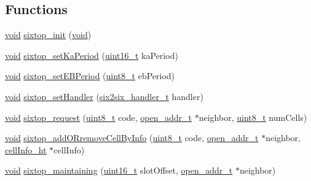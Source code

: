\subsection*{Functions}
\begin{DoxyCompactItemize}
\item 
\hyperlink{usb__devapi_8h_afabf60e7f57651d6d595a02c75f07cd0}{void} \hyperlink{group__sixtop_ga7ebc63dd17f632acdb878a79c1d79da8}{sixtop\+\_\+init} (\hyperlink{usb__devapi_8h_afabf60e7f57651d6d595a02c75f07cd0}{void})
\item 
\hyperlink{usb__devapi_8h_afabf60e7f57651d6d595a02c75f07cd0}{void} \hyperlink{group__sixtop_ga462512c8c301081df10b0d51f7e7bc8b}{sixtop\+\_\+set\+Ka\+Period} (\hyperlink{_p_e___types_8h_a1f1825b69244eb3ad2c7165ddc99c956}{uint16\+\_\+t} ka\+Period)
\item 
\hyperlink{usb__devapi_8h_afabf60e7f57651d6d595a02c75f07cd0}{void} \hyperlink{group__sixtop_ga075d83ee0b50fe58ddb21fe5461b8d37}{sixtop\+\_\+set\+E\+B\+Period} (\hyperlink{_p_e___types_8h_aba7bc1797add20fe3efdf37ced1182c5}{uint8\+\_\+t} eb\+Period)
\item 
\hyperlink{usb__devapi_8h_afabf60e7f57651d6d595a02c75f07cd0}{void} \hyperlink{group__sixtop_ga88c7b3727422755c34000ca4600abfa2}{sixtop\+\_\+set\+Handler} (\hyperlink{group__sixtop_gaa3d42866c0888ad4ae5166773563addd}{six2six\+\_\+handler\+\_\+t} handler)
\item 
\hyperlink{usb__devapi_8h_afabf60e7f57651d6d595a02c75f07cd0}{void} \hyperlink{group__sixtop_ga2839458024d85a3e05fb67767fe7adb9}{sixtop\+\_\+request} (\hyperlink{_p_e___types_8h_aba7bc1797add20fe3efdf37ced1182c5}{uint8\+\_\+t} code, \hyperlink{structopen__addr__t}{open\+\_\+addr\+\_\+t} $\ast$neighbor, \hyperlink{_p_e___types_8h_aba7bc1797add20fe3efdf37ced1182c5}{uint8\+\_\+t} num\+Cells)
\item 
\hyperlink{usb__devapi_8h_afabf60e7f57651d6d595a02c75f07cd0}{void} \hyperlink{group__sixtop_ga83ffb7e25a1e635539b526b15f857dbd}{sixtop\+\_\+add\+O\+Rremove\+Cell\+By\+Info} (\hyperlink{_p_e___types_8h_aba7bc1797add20fe3efdf37ced1182c5}{uint8\+\_\+t} code, \hyperlink{structopen__addr__t}{open\+\_\+addr\+\_\+t} $\ast$neighbor, \hyperlink{structcell_info__ht}{cell\+Info\+\_\+ht} $\ast$cell\+Info)
\item 
\hyperlink{usb__devapi_8h_afabf60e7f57651d6d595a02c75f07cd0}{void} \hyperlink{group__sixtop_gacfaa93a6c2b7348a48913b44e00a5205}{sixtop\+\_\+maintaining} (\hyperlink{_p_e___types_8h_a1f1825b69244eb3ad2c7165ddc99c956}{uint16\+\_\+t} slot\+Offset, \hyperlink{structopen__addr__t}{open\+\_\+addr\+\_\+t} $\ast$neighbor)

\end{DoxyCompactItemize}
